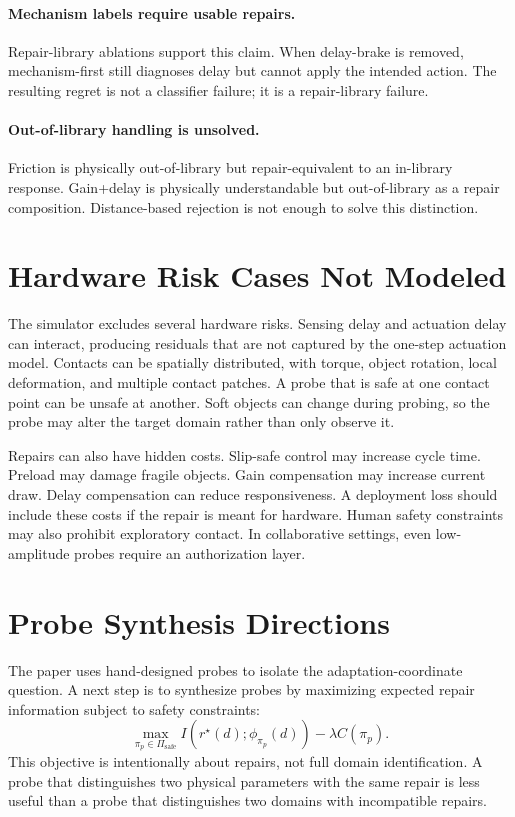 \documentclass{article}
\begin{document}
\paragraph{Mechanism labels require usable repairs.}
Repair-library ablations support this claim. When delay-brake is removed,
mechanism-first still diagnoses delay but cannot apply the intended action. The
resulting regret is not a classifier failure; it is a repair-library failure.

\paragraph{Out-of-library handling is unsolved.}
Friction is physically out-of-library but repair-equivalent to an in-library
response. Gain+delay is physically understandable but out-of-library as a repair
composition. Distance-based rejection is not enough to solve this distinction.

\section{Hardware Risk Cases Not Modeled}

The simulator excludes several hardware risks. Sensing delay and actuation delay
can interact, producing residuals that are not captured by the one-step actuation
model. Contacts can be spatially distributed, with torque, object rotation,
local deformation, and multiple contact patches. A probe that is safe at one
contact point can be unsafe at another. Soft objects can change during probing,
so the probe may alter the target domain rather than only observe it.

Repairs can also have hidden costs. Slip-safe control may increase cycle time.
Preload may damage fragile objects. Gain compensation may increase current draw.
Delay compensation can reduce responsiveness. A deployment loss should include
these costs if the repair is meant for hardware. Human safety constraints may
also prohibit exploratory contact. In collaborative settings, even low-amplitude
probes require an authorization layer.

\section{Probe Synthesis Directions}

The paper uses hand-designed probes to isolate the adaptation-coordinate
question. A next step is to synthesize probes by maximizing expected repair
information subject to safety constraints:
\[
\max_{\pi_p \in \Pi_{\mathrm{safe}}}
I(r^\star(d); \phi_{\pi_p}(d)) - \lambda C(\pi_p).
\]
This objective is intentionally about repairs, not full domain identification. A
probe that distinguishes two physical parameters with the same repair is less
useful than a probe that distinguishes two domains with incompatible repairs.
\end{document}
